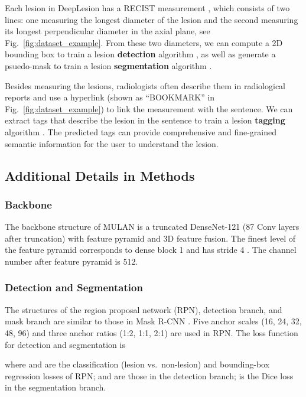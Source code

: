 \documentclass[runningheads]{llncs}
\def\Fig#1{{Fig.\ \ref{fig:#1}}}
\begin{document}
Each lesion in DeepLesion has a RECIST measurement \cite{Eisenhauer2009RECIST}, which consists of two lines: one measuring the longest diameter of the lesion and the second measuring its longest perpendicular diameter in the axial plane, see \Fig{dataset_example}. From these two diameters, we can compute a 2D bounding box to train a lesion \textbf{detection} algorithm \cite{Yan2018DeepLesion}, as well as generate a psuedo-mask to train a lesion \textbf{segmentation} algorithm \cite{Tang2019Uldor}.

Besides measuring the lesions, radiologists often describe them in radiological reports and use a hyperlink (shown as ``BOOKMARK'' in \Fig{dataset_example}) to link the measurement with the sentence. We can extract tags that describe the lesion in the sentence to train a lesion \textbf{tagging} algorithm \cite{Yan2019Lesa}. The predicted tags can provide comprehensive and fine-grained semantic information for the user to understand the lesion.

\subsection{Additional Details in Methods}

\subsubsection{Backbone}

The backbone structure of MULAN is a truncated DenseNet-121 \cite{Huang2017DenseNet} (87 Conv layers after truncation) with feature pyramid \cite{Lin2016Pyramid} and 3D feature fusion. The finest level of the feature pyramid corresponds to dense block 1 and has stride 4 \cite{Lin2016Pyramid}. The channel number after feature pyramid is 512.

\subsubsection{Detection and Segmentation}

The structures of the region proposal network (RPN), detection branch, and mask branch are similar to those in Mask R-CNN \cite{He2017MaskRCNN}. Five anchor scales (16, 24, 32, 48, 96) and three anchor ratios (1:2, 1:1, 2:1) are used in RPN. The loss function for detection and segmentation is

where  and  are the classification (lesion vs.\ non-lesion) and bounding-box regression \cite{He2017MaskRCNN} losses of RPN;  and  are those in the detection branch;  is the Dice loss \cite{Milletari2016Vnet} in the segmentation branch.
\end{document}
